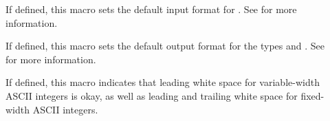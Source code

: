 \begin{description}
\item[] If defined, this macro sets the default
  input format for .  See
   for more
  information.
\item[] If defined, this macro sets the default
  output format for the \pads{} types  and .  See
   for more information.
\item[] If defined, this macro indicates that leading
  white space for variable-width ASCII integers is okay, as well as
  leading and trailing white space for fixed-width ASCII integers.

\end{description}
